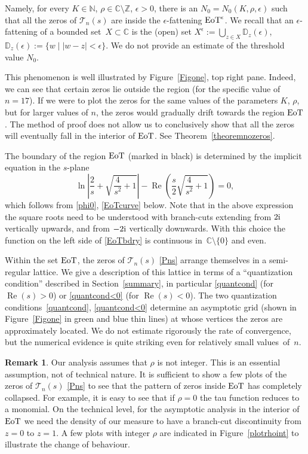 \documentclass[pdftex]{sigma}
\numberwithin{equation}{section}
\theoremstyle{definition}
\newtheorem{Remark}[Theorem]{Remark}
\def \DD{\mathbb D}
\def\le{\left}
\def\ri{\right}
\def\be{\begin{equation}}
\def\ee{\end{equation}}
\def\C{{\mathbb C}}
\def\Z{{\mathbb Z}}
\def\N{{\mathbb N}}
\def \Re{\operatorname{Re} }
\def\la{\label}
\begin{document}
Namely, for every $K\in \N$, $ \rho\in \C\setminus \Z$, $\epsilon>0$, there is an $N_0= N_0(K, \rho, \epsilon)$ such that all the zeros of $\mathcal T_n(s)$ are inside the $\epsilon$-fattening ${\rm EoT}^\epsilon$. We recall that an $\epsilon$-fattening of a bounded set~${X\subset \C}$ is the (open) set
$
X^\epsilon:= \bigcup_{z\in X} \DD_z(\epsilon )$, $ \DD_z(\epsilon):=\{w\mid |w-z|<\epsilon\}$.
We do not provide an estimate of the threshold value $N_0$.

This phenomenon is well illustrated by Figure~\ref{Figone}, top right pane. Indeed, we can see that certain zeros lie outside the region (for the specific value of $n=17$). If we were to plot the zeros for the same values of the parameters ${K}$, ${\rho}$, but for larger values of $n$, the zeros would gradually drift towards the region ${\rm EoT}$. The method of proof does not allow us to conclusively show that all the zeros will eventually fall in the interior of ${\rm EoT}$. See Theorem~\ref{theoremnozeros}.

 The boundary of the region ${\rm EoT}$ (marked in black) is determined by the implicit equation in the $s$-plane
\be
\label{EoTbdry}
 \ln\le|\frac {2}{s} + \sqrt{\frac {4}{s^2}+1}\ri| - \Re\le(\frac s 2\sqrt{ \frac {4}{s^2} + 1} \ri)=0,
\ee
which follows from \eqref{phi0}, \eqref{EoTcurve} below. Note that in the above expression the square roots need to be understood with branch-cuts extending from $2{\rm i}$ vertically upwards, and from $-2{\rm i}$ vertically downwards. With this choice the function on the left side of \eqref{EoTbdry} is continuous in~${\C\setminus\{0\}}$ and even.

Within the set ${\rm EoT}$, the zeros of $\mathcal T_n(s)$ \eqref{Pns} arrange themselves in a semi-regular lattice. We give a description of this lattice in terms of a ``quantization condition'' described in Section~\ref{summary}, in particular \eqref{quantcond} (for $\Re (s)>0$) or \eqref{quantcond<0} (for $\Re (s)<0$). The two quantization conditions~\eqref{quantcond}, \eqref{quantcond<0} determine an asymptotic grid (shown in Figure~\ref{Figone} in green and blue thin lines) at whose vertices the zeros are approximately located. We do not estimate rigorously the rate of convergence, but the numerical evidence is quite striking even for relatively small values~of~$n$.

\begin{Remark}\la{rhoint}
Our analysis assumes that $\rho$ is not integer. This is an essential assumption, not of technical nature. It is sufficient to show a few plots of the zeros of $\mathcal T_n(s)$ \eqref{Pns} to see that the pattern of zeros inside ${\rm EoT}$ has completely collapsed. For example, it is easy to see that if $\rho=0$ the tau function reduces to a monomial. On the technical level, for the asymptotic analysis in the interior of ${\rm EoT}$ we need the density of our measure to have a branch-cut discontinuity from~${z=0}$ to $z=1$. A few plots with integer $\rho$ are indicated in Figure~\ref{plotrhoint} to illustrate the change of behaviour.
\end{Remark}
\end{document}
